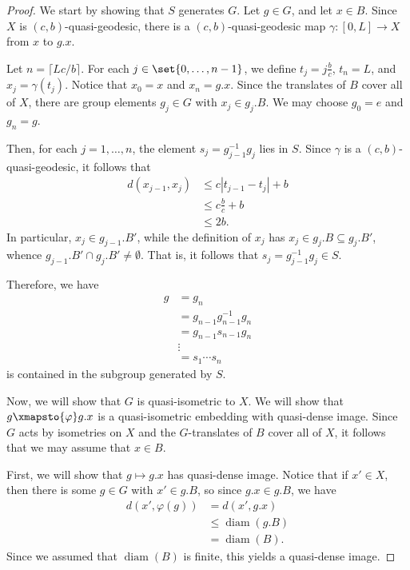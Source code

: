\documentclass[10pt]{mypackage}
\begin{document}
\begin{proof}
  We start by showing that $S$ generates $G$. Let $g\in G$, and let $x\in B$. Since $X$ is $\left( c,b \right)$-quasi-geodesic, there is a $\left( c,b \right)$-quasi-geodesic map $\gamma\colon [0,L]\rightarrow X$ from $x$ to $g.x$.

  Let $n = \lceil Lc/b\rceil$. For each $j\in \set{0,\dots,n-1}$, we define $t_j = j\frac{b}{c}$, $t_n = L$, and $x_j = \gamma\left( t_j \right)$. Notice that $x_0 = x$ and $x_n = g.x$. Since the translates of $B$ cover all of $X$, there are group elements $g_j\in G$ with $x_j\in g_j.B$. We may choose $g_0 = e$ and $g_n = g$.

  Then, for each $j=1,\dots,n$, the element $s_j = g_{j-1}^{-1}g_j$ lies in $S$. Since $\gamma$ is a $\left( c,b \right)$-quasi-geodesic, it follows that
  \begin{align*}
    d\left( x_{j-1},x_j \right) &\leq c\left\vert t_{j-1}-t_j \right\vert + b\\
                                &\leq c \frac{b}{c} + b\\
                                &\leq 2b.
  \end{align*}
  In particular, $x_j\in g_{j-1}.B'$, while the definition of $x_j$ has $x_j\in g_j.B \subseteq g_j.B'$, whence $g_{j-1}.B'\cap g_j.B' \neq \emptyset$. That is, it follows that $s_{j} = g_{j-1}^{-1}g_j\in S$.

  Therefore, we have
  \begin{align*}
    g &= g_n\\
      &= g_{n-1}g_{n-1}^{-1}g_n\\
      &= g_{n-1}s_{n-1}g_n\\
      &\vdots\\
      &= s_1\cdots s_n
  \end{align*}
  is contained in the subgroup generated by $S$.

  Now, we will show that $G$ is quasi-isometric to $X$. We will show that $g\xmapsto{\varphi} g.x$ is a quasi-isometric embedding with quasi-dense image. Since $G$ acts by isometries on $X$ and the $G$-translates of $B$ cover all of $X$, it follows that we may assume that $x\in B$.

  First, we will show that $g\mapsto g.x$ has quasi-dense image. Notice that if $x'\in X$, then there is some $g\in G$ with $x'\in g.B$, so since $g.x\in g.B$, we have
  \begin{align*}
    d\left( x',\varphi(g) \right) &= d\left( x',g.x \right)\\
                                  &\leq \operatorname{diam}\left( g.B \right)\\
                                  &= \operatorname{diam}\left( B \right).
  \end{align*}
  Since we assumed that $ \operatorname{diam}\left( B \right) $ is finite, this yields a quasi-dense image.


\end{proof}
\end{document}
